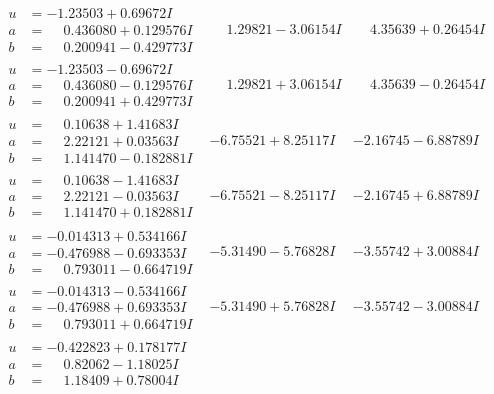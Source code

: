 \documentclass[1p]{elsarticle_modified}
\theoremstyle{definition}
\begin{document}
$$\begin{array}{c|c|c}
\begin{aligned}
u &= -1.23503 + 0.69672 I \\
a &= \phantom{-}0.436080 + 0.129576 I \\
b &= \phantom{-}0.200941 - 0.429773 I\end{aligned}
 & \phantom{-}1.29821 - 3.06154 I & \phantom{-}4.35639 + 0.26454 I \\ \hline\begin{aligned}
u &= -1.23503 - 0.69672 I \\
a &= \phantom{-}0.436080 - 0.129576 I \\
b &= \phantom{-}0.200941 + 0.429773 I\end{aligned}
 & \phantom{-}1.29821 + 3.06154 I & \phantom{-}4.35639 - 0.26454 I \\ \hline\begin{aligned}
u &= \phantom{-}0.10638 + 1.41683 I \\
a &= \phantom{-}2.22121 + 0.03563 I \\
b &= \phantom{-}1.141470 - 0.182881 I\end{aligned}
 & -6.75521 + 8.25117 I & -2.16745 - 6.88789 I \\ \hline\begin{aligned}
u &= \phantom{-}0.10638 - 1.41683 I \\
a &= \phantom{-}2.22121 - 0.03563 I \\
b &= \phantom{-}1.141470 + 0.182881 I\end{aligned}
 & -6.75521 - 8.25117 I & -2.16745 + 6.88789 I \\ \hline\begin{aligned}
u &= -0.014313 + 0.534166 I \\
a &= -0.476988 - 0.693353 I \\
b &= \phantom{-}0.793011 - 0.664719 I\end{aligned}
 & -5.31490 - 5.76828 I & -3.55742 + 3.00884 I \\ \hline\begin{aligned}
u &= -0.014313 - 0.534166 I \\
a &= -0.476988 + 0.693353 I \\
b &= \phantom{-}0.793011 + 0.664719 I\end{aligned}
 & -5.31490 + 5.76828 I & -3.55742 - 3.00884 I \\ \hline\begin{aligned}
u &= -0.422823 + 0.178177 I \\
a &= \phantom{-}0.82062 - 1.18025 I \\
b &= \phantom{-}1.18409 + 0.78004 I\end{aligned}

\end{array}$$
\end{document}
